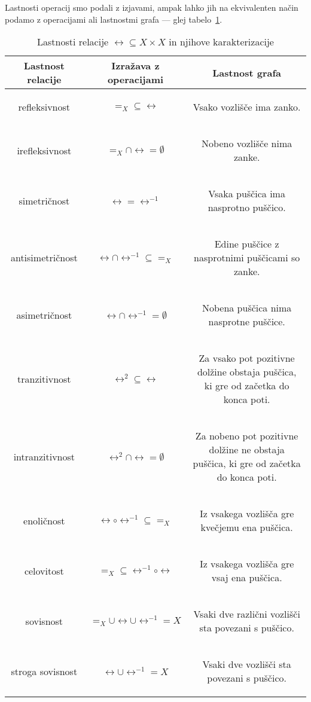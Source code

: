 		Lastnosti operacij smo podali z izjavami, ampak lahko jih na ekvivalenten način podamo z operacijami ali lastnostmi grafa --- glej tabelo~\ref{TABELA: Lastnosti relacije}.
		
		
		\begin{table}[!ht]
			\centering
			\newcommand{\opis}[1]{\begin{minipage}{0.45\textwidth}\begin{center}{#1}\end{center}\end{minipage}}
			\def\arraystretch{3}
			\begin{tabular}{|ccc|}
				\hline
				\textbf{Lastnost relacije} & \textbf{Izražava z operacijami} & \textbf{Lastnost grafa} \\
				\hline
				refleksivnost & $=_X \subseteq \rel$ & \opis{Vsako vozlišče ima zanko.} \\
				irefleksivnost & $=_X \cap \rel = \emptyset$ & \opis{Nobeno vozlišče nima zanke.} \\
				simetričnost & $\rel = \rel^{-1}$ & \opis{Vsaka puščica ima nasprotno puščico.} \\
				antisimetričnost & $\rel \cap \rel^{-1} \subseteq =_X$ & \opis{Edine puščice z nasprotnimi puščicami so zanke.} \\
				asimetričnost & $\rel \cap \rel^{-1} = \emptyset$ & \opis{Nobena puščica nima nasprotne puščice.} \\
				tranzitivnost & $\rel^2 \subseteq \rel$ & \opis{Za vsako pot pozitivne dolžine obstaja puščica, ki gre od začetka do konca poti.} \\
				intranzitivnost & $\rel^2 \cap \rel = \emptyset$ & \opis{Za nobeno pot pozitivne dolžine ne obstaja puščica, ki gre od začetka do konca poti.} \\
				enoličnost & $\rel \circ \rel^{-1} \subseteq =_X$ & \opis{Iz vsakega vozlišča gre kvečjemu ena puščica.} \\
				celovitost & $=_X \subseteq \rel^{-1} \circ \rel$ & \opis{Iz vsakega vozlišča gre vsaj ena puščica.} \\
				sovisnost & $=_X \cup \rel \cup \rel^{-1} = X$ & \opis{Vsaki dve različni vozlišči sta povezani s puščico.} \\
				stroga sovisnost & $\rel \cup \rel^{-1} = X$ & \opis{Vsaki dve vozlišči sta povezani s puščico.} \\
				\hline
			\end{tabular}
			\caption{Lastnosti relacije $\rel \subseteq X \times X$ in njihove karakterizacije}\label{TABELA: Lastnosti relacije}
		\end{table}
		
